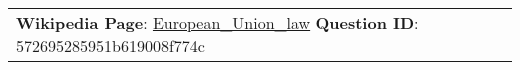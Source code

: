\begin{figure*}[ht]
{\begin{tabular}{p{}}
            \textbf{Wikipedia Page}: \underline{European\_Union\_law} \textbf{Question ID}: 572695285951b619008f774c                                                                                                                                                                                                                                                                                                                                                                                                                                                                                                                                                                                                                                                                                                                                                                                                                                                                                                                                                                                                                                                                                                                                                                                                                                                                                                                                                                                                                                                                                                                                                                                                                                                   \\

\end{tabular}}
\end{figure*}

